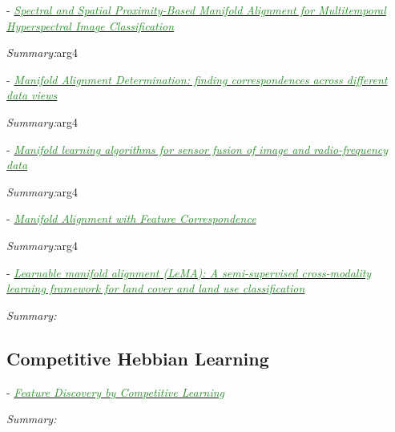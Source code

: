 \documentclass[]{article}
\newcommand{\paperentry}[4]{
            \hangindent=1cm
            \cite{#1} - \href{run:../References/#3}{\textcolor{ForestGreen}{\textit{#2}}}
            
            \noindent            
            \begin{minipage}[t]{0.1\linewidth}\hfill\end{minipage}
            \begin{minipage}[t]{0.8\linewidth}\textcolor{NavyBlue}{{\textit{Summary:}}}#4\end{minipage}
            \vspace{.25cm}
          }
\begin{document}
		\paperentry{Yang2016ManifoldAlignmentMultitemporalHSI}
		{Spectral and Spatial Proximity-Based Manifold Alignment for Multitemporal Hyperspectral Image Classification}
		{Manifold_Representation_Learning/Alignment/Yang2016ManifoldAlignmentMultitemporalHSI.pdf}
		{arg4}
		
		\paperentry{Damianou2017ManifoldAlignmentDifferentDataView}
		{Manifold Alignment Determination: finding correspondences across different data views}
		{Manifold_Representation_Learning/Alignment/Damianou2017ManifoldAlignmentDifferentDataView.pdf}
		{arg4}
		
		\paperentry{Shen2018ManifoldSensorFusionImageData}
		{Manifold learning algorithms for sensor fusion of image and radio-frequency data}
		{Manifold_Representation_Learning/Alignment/Shen2018ManifoldSensorFusionImageData.pdf}
		{arg4}
		
		\paperentry{Stanley2019ManAlignmentFeatureCorrespondence}
		{Manifold Alignment with Feature Correspondence}
		{Manifold_Representation_Learning/Alignment/Stanley2019ManAlignmentFeatureCorrespondence.pdf}
		{arg4}
		
		\paperentry{Hong2019LearnableManifoldAlignment}
		{Learnable manifold alignment (LeMA): A semi-supervised cross-modality learning framework for land cover and land use classification}
		{Manifold_Representation_Learning/Alignment/Hong2019LearnableManifoldAlignment.pdf}
		{}
	
	
	\subsection{Competitive Hebbian Learning}
	
	\paperentry
	{Rumelhart1985CHL}
	{Feature Discovery by Competitive Learning}
	{Manifold_Representation_Learning/CHL/Rumelhart1985CHL.pdf}
	{}
	
\end{document}
